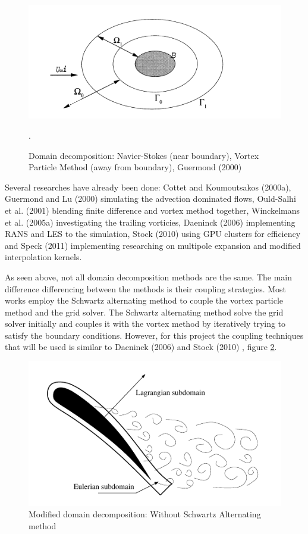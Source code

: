 \begin{figure}[h]
\centering
\includegraphics[width=0.7\linewidth]{figures/introduction/domainDecomposition}
\caption{Domain decomposition: Navier-Stokes (near boundary), Vortex Particle Method (away from boundary), Guermond (2000) \cite{Guermond2000}}.
\label{fig:domainDecomposition}
\end{figure}

Several researches have already been done: Cottet and Koumoutsakos (2000a)\cite{Cottet2000a}, Guermond and Lu (2000) \cite{Guermond2000} simulating the advection dominated flows, Ould-Salhi et al. (2001) \cite{Ould-Salihi2001} blending finite difference and vortex method together, Winckelmans et al. (2005a) \cite{Winckelmans2005a} investigating the trailing vorticies, Daeninck (2006) \cite{Daeninck2006} implementing RANS and LES to the simulation, Stock (2010) \cite{Stock} using GPU clusters for efficiency and Speck (2011) \cite{Speck2011a} implementing researching on multipole expansion and modified interpolation kernels.

As seen above, not all domain decomposition methods are the same. The main difference differencing between the methods is their coupling strategies. Most works employ the Schwartz alternating method to couple the vortex particle method and the grid solver. The Schwartz alternating method solve the grid solver initially and couples it with the vortex method by iteratively trying to satisfy the boundary conditions. However, for this project the coupling techniques that will be used is similar to Daeninck (2006) \cite{Daeninck2006} and Stock (2010) \cite{Stock}, figure \ref{fig:newDD}.

\begin{figure}[h]
\centering
\includegraphics[width=0.7\linewidth]{figures/introduction/daenick}
\caption{Modified domain decomposition: Without Schwartz Alternating method \cite{Daeninck2006}}
\label{fig:newDD}
\end{figure}

